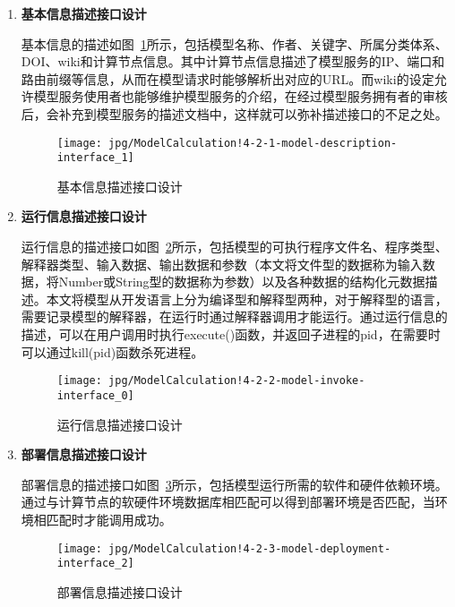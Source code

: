 \begin{enumerate}[(1)]
\item \textbf{基本信息描述接口设计}

基本信息的描述如图~\ref{fig:ModelCalculation!4-2-1-model-description-interface_1}所示，包括模型名称、作者、关键字、所属分类体系、DOI、wiki和计算节点信息。其中计算节点信息描述了模型服务的IP、端口和路由前缀等信息，从而在模型请求时能够解析出对应的URL。而wiki的设定允许模型服务使用者也能够维护模型服务的介绍，在经过模型服务拥有者的审核后，会补充到模型服务的描述文档中，这样就可以弥补描述接口的不足之处。

\begin{figure}[!htbp]
    \centering
    \texttt{[image: jpg/ModelCalculation!4-2-1-model-description-interface\_1]}
    \caption{基本信息描述接口设计}
    \label{fig:ModelCalculation!4-2-1-model-description-interface_1}
\end{figure}

\item \textbf{运行信息描述接口设计}
\label{sec:io-interface}

运行信息的描述接口如图~\ref{fig:ModelCalculation!4-2-2-model-invoke-interface_0}所示，包括模型的可执行程序文件名、程序类型、解释器类型、输入数据、输出数据和参数（本文将文件型的数据称为输入数据，将Number或String型的数据称为参数）以及各种数据的结构化元数据描述。本文将模型从开发语言上分为编译型和解释型两种，对于解释型的语言，需要记录模型的解释器，在运行时通过解释器调用才能运行。通过运行信息的描述，可以在用户调用时执行execute()函数，并返回子进程的pid，在需要时可以通过kill(pid)函数杀死进程。

\begin{figure}[!htbp]
    \centering
    \texttt{[image: jpg/ModelCalculation!4-2-2-model-invoke-interface\_0]}
    \caption{运行信息描述接口设计}
    \label{fig:ModelCalculation!4-2-2-model-invoke-interface_0}
\end{figure}

\item \textbf{部署信息描述接口设计}

部署信息的描述接口如图~\ref{fig:ModelCalculation!4-2-3-model-deployment-interface_2}所示，包括模型运行所需的软件和硬件依赖环境。通过与计算节点的软硬件环境数据库相匹配可以得到部署环境是否匹配，当环境相匹配时才能调用成功。

\begin{figure}[!htbp]
    \centering
    \texttt{[image: jpg/ModelCalculation!4-2-3-model-deployment-interface\_2]}
    \caption{部署信息描述接口设计}
    \label{fig:ModelCalculation!4-2-3-model-deployment-interface_2}
\end{figure}
\end{enumerate}

